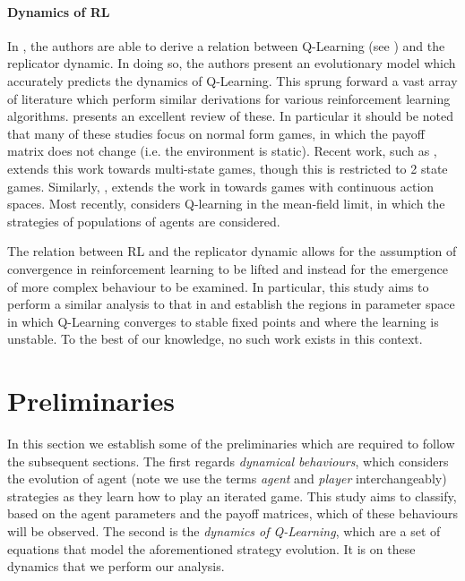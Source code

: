 \documentclass[sigconf,anonymous]{aamas}
\begin{document}
\paragraph{Dynamics of RL} In \cite{Tuyls2006AnGames}, the authors are able to derive a relation between Q-Learning (see \cite{Barber2012}) and the replicator dynamic. In doing so, the authors present an evolutionary model which accurately predicts the dynamics of Q-Learning. This sprung forward a vast array of literature which perform similar derivations for various reinforcement learning algorithms. \cite{Bloembergen2015} presents an excellent review of these. In particular it should be noted that many of these studies focus on normal form games, in which the payoff matrix does not change (i.e. the environment is static). Recent work, such as \cite{Hennes2008}, extends this work towards multi-state games, though this is restricted to 2 state games. Similarly, \cite{Galstyan2013}, extends the work in \cite{Tuyls2006AnGames} towards games with continuous action spaces. Most recently, \cite{Hu2019} considers Q-learning in the mean-field limit, in which the strategies of populations of agents are considered. 

The relation between RL and the replicator dynamic allows for the assumption of convergence in reinforcement learning to be lifted and instead for the emergence of more complex behaviour to be examined. In particular, this study aims to perform a similar analysis to that in \cite{Sanders2018} and establish the regions in parameter space in which Q-Learning converges to stable fixed points and where the learning is unstable. To the best of our knowledge, no such work exists in this context. 

\newpage


\section{Preliminaries}

In this section we establish some of the preliminaries which
are required to follow the subsequent sections. The first regards
\textit{dynamical behaviours}, which considers the evolution of agent (note we use the terms \textit{agent} and \textit{player} interchangeably)
strategies as they learn how to play an iterated game. This study aims to
classify, based on the agent parameters and the payoff matrices, which
of these behaviours will be observed. The second is the \textit{dynamics
  of Q-Learning}, which are a set of equations that model the
aforementioned strategy evolution. It is on these dynamics that we
perform our analysis.
\end{document}
